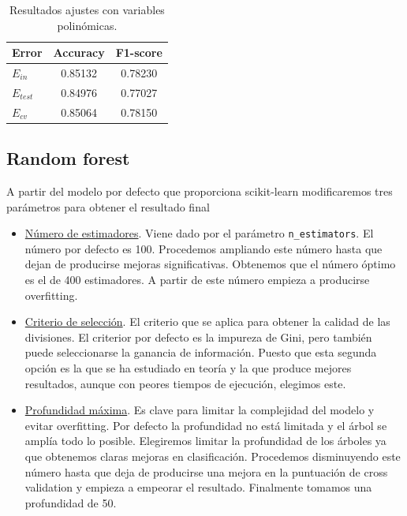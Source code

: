 \documentclass[11pt,a4paper]{article}
\begin{document}
\begin{table}[h]
\begin{center}
\begin{tabular}{|l|c|c|}
\hline
  Error & Accuracy & F1-score \\ \hline
  $E_{in}$ & 0.85132 & 0.78230 \\
  $E_{test}$ & 0.84976 & 0.77027  \\
  $E_{cv}$ &0.85064 & 0.78150  \\\hline
\end{tabular}
\caption{Resultados ajustes con variables polinómicas.}

\end{center}
\end{table}

\subsection{Random forest}

A partir del modelo por defecto que proporciona scikit-learn modificaremos tres parámetros para obtener el resultado final

\begin{itemize}
\item \underline{Número de estimadores}. Viene dado por el parámetro \texttt{n\_estimators}. El número por defecto es 100. Procedemos ampliando este número hasta que dejan de producirse mejoras significativas. Obtenemos que el número óptimo es el de 400 estimadores. A partir de este número empieza a producirse overfitting.
\item \underline{Criterio de selección}. El criterio que se aplica para obtener la calidad de las divisiones. El criterior por defecto es la impureza de Gini, pero también puede seleccionarse la ganancia de información. Puesto que esta segunda opción es la que se ha estudiado en teoría y la que produce mejores resultados, aunque con peores tiempos de ejecución, elegimos este. 
\item \underline{Profundidad máxima}. Es clave para limitar la complejidad del modelo y evitar overfitting. Por defecto la profundidad no está limitada y el árbol se amplía todo lo posible. Elegiremos limitar la profundidad de los árboles ya que obtenemos claras mejoras en clasificación. Procedemos disminuyendo este número hasta que deja de producirse una mejora en la puntuación de cross validation y empieza a empeorar el resultado. Finalmente tomamos una profundidad de 50.
\end{itemize}
\end{document}
